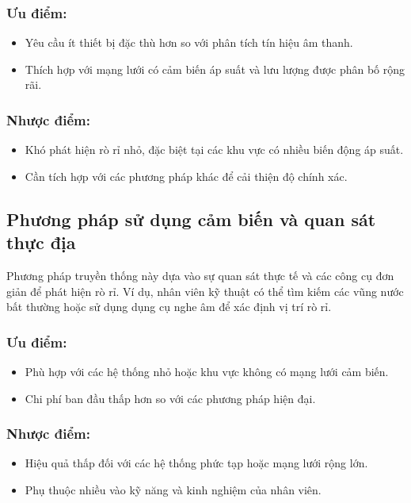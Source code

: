 \subsubsection{Ưu điểm:}
\begin{itemize}
    \item Yêu cầu ít thiết bị đặc thù hơn so với phân tích tín hiệu âm thanh.
    \item Thích hợp với mạng lưới có cảm biến áp suất và lưu lượng được phân bố rộng rãi.
\end{itemize}

\subsubsection{Nhược điểm:}
\begin{itemize}
    \item Khó phát hiện rò rỉ nhỏ, đặc biệt tại các khu vực có nhiều biến động áp suất.
    \item Cần tích hợp với các phương pháp khác để cải thiện độ chính xác.
\end{itemize}

\subsection{Phương pháp sử dụng cảm biến và quan sát thực địa}
Phương pháp truyền thống này dựa vào sự quan sát thực tế và các công cụ đơn giản để phát hiện rò rỉ. Ví dụ, nhân viên kỹ thuật có thể tìm kiếm các vũng nước bất thường hoặc sử dụng dụng cụ nghe âm để xác định vị trí rò rỉ.

\subsubsection{Ưu điểm:}
\begin{itemize}
    \item Phù hợp với các hệ thống nhỏ hoặc khu vực không có mạng lưới cảm biến.
    \item Chi phí ban đầu thấp hơn so với các phương pháp hiện đại.
\end{itemize}

\subsubsection{Nhược điểm:}
\begin{itemize}
    \item Hiệu quả thấp đối với các hệ thống phức tạp hoặc mạng lưới rộng lớn.
    \item Phụ thuộc nhiều vào kỹ năng và kinh nghiệm của nhân viên.
\end{itemize}

